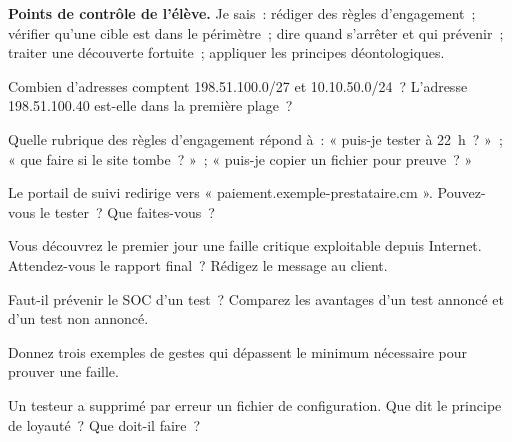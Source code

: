 \begin{boxinfo}
\textbf{Points de contrôle de l'élève.} Je sais~: rédiger des règles
d'engagement~; vérifier qu'une cible est dans le périmètre~; dire quand
s'arrêter et qui prévenir~; traiter une découverte fortuite~; appliquer
les principes déontologiques.
\end{boxinfo}

\bigskip

\begin{boxexo}[title={\ding{45}\quad Exercice~3.1. CIDR \niveaubase}]
Combien d'adresses comptent 198.51.100.0/27 et 10.10.50.0/24~? L'adresse
198.51.100.40 est-elle dans la première plage~?
\end{boxexo}

\begin{boxexo}[title={\ding{45}\quad Exercice~3.2. Les rubriques \niveaubase}]
Quelle rubrique des règles d'engagement répond à~: « puis-je tester à
22~h~? »~; « que faire si le site tombe~? »~; « puis-je copier un fichier
pour preuve~? »
\end{boxexo}

\begin{boxexo}[title={\ding{45}\quad Exercice~3.3. Redirection \niveaubase}]
Le portail de suivi redirige vers « paiement.exemple-prestataire.cm ».
Pouvez-vous le tester~? Que faites-vous~?
\end{boxexo}

\begin{boxexo}[title={\ding{45}\quad Exercice~3.4. Faille critique \niveaumoyen}]
Vous découvrez le premier jour une faille critique exploitable depuis
Internet. Attendez-vous le rapport final~? Rédigez le message au client.
\end{boxexo}

\begin{boxexo}[title={\ding{45}\quad Exercice~3.5. Le SOC \niveaumoyen}]
Faut-il prévenir le SOC d'un test~? Comparez les avantages d'un test annoncé
et d'un test non annoncé.
\end{boxexo}

\begin{boxexo}[title={\ding{45}\quad Exercice~3.6. Minimisation \niveaumoyen}]
Donnez trois exemples de gestes qui dépassent le minimum nécessaire pour
prouver une faille.
\end{boxexo}

\begin{boxexo}[title={\ding{45}\quad Exercice~3.7. Sa propre erreur \niveaumoyen}]
Un testeur a supprimé par erreur un fichier de configuration. Que dit le
principe de loyauté~? Que doit-il faire~?
\end{boxexo}


